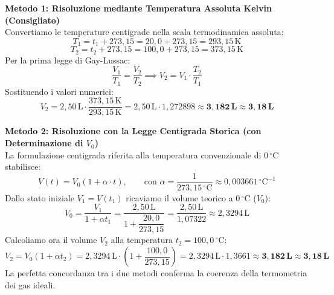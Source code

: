\documentclass[11pt,a4paper,oneside]{report}
\begin{document}
\begin{problema}
\textbf{Metodo 1: Risoluzione mediante Temperatura Assoluta Kelvin (Consigliato)}\\
Convertiamo le temperature centigrade nella scala termodinamica assoluta:
\[
T_1 = t_1 + 273{,}15 = 20{,}0 + 273{,}15 = 293{,}15\,\text{K}
\]
\[
T_2 = t_2 + 273{,}15 = 100{,}0 + 273{,}15 = 373{,}15\,\text{K}
\]
Per la prima legge di Gay-Lussac:
\[
\frac{V_1}{T_1} = \frac{V_2}{T_2} \implies V_2 = V_1 \cdot \frac{T_2}{T_1}
\]
Sostituendo i valori numerici:
\[
V_2 = 2{,}50\,\text{L} \cdot \frac{373{,}15\,\text{K}}{293{,}15\,\text{K}} = 2{,}50\,\text{L} \cdot 1{,}272898 \approx \mathbf{3{,}182\,\text{L}} \approx \mathbf{3{,}18\,\text{L}}
\]

\textbf{Metodo 2: Risoluzione con la Legge Centigrada Storica (con Determinazione di $V_0$)}\\
La formulazione centigrada riferita alla temperatura convenzionale di $0\,^\circ\text{C}$ stabilisce:
\[
V(t) = V_0 (1 + \alpha \cdot t), \qquad \text{con } \alpha = \frac{1}{273{,}15\,^\circ\text{C}} \approx 0{,}003661\,^\circ\text{C}^{-1}
\]
Dallo stato iniziale $V_1 = V(t_1)$ ricaviamo il volume teorico a $0\,^\circ\text{C}$ ($V_0$):
\[
V_0 = \frac{V_1}{1 + \alpha t_1} = \frac{2{,}50\,\text{L}}{1 + \dfrac{20{,}0}{273{,}15}} = \frac{2{,}50\,\text{L}}{1{,}07322} \approx 2{,}3294\,\text{L}
\]
Calcoliamo ora il volume $V_2$ alla temperatura $t_2 = 100{,}0\,^\circ\text{C}$:
\[
V_2 = V_0 (1 + \alpha t_2) = 2{,}3294\,\text{L} \cdot \left(1 + \frac{100{,}0}{273{,}15}\right) = 2{,}3294\,\text{L} \cdot 1{,}3661 \approx \mathbf{3{,}182\,\text{L}} \approx \mathbf{3{,}18\,\text{L}}
\]
La perfetta concordanza tra i due metodi conferma la coerenza della termometria dei gas ideali.
\end{problema}
\end{document}

